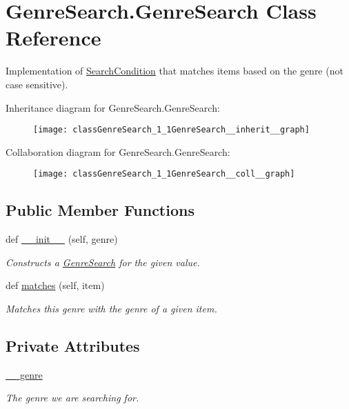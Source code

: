 \hypertarget{classGenreSearch_1_1GenreSearch}{}\section{Genre\+Search.\+Genre\+Search Class Reference}
\label{classGenreSearch_1_1GenreSearch}


Implementation of \hyperlink{namespaceSearchCondition}{Search\+Condition} that matches items based on the genre (not case sensitive).  




Inheritance diagram for Genre\+Search.\+Genre\+Search\+:\nopagebreak
\begin{figure}[H]
\begin{center}
\leavevmode
\texttt{[image: classGenreSearch\_1\_1GenreSearch\_\_inherit\_\_graph]}
\end{center}
\end{figure}


Collaboration diagram for Genre\+Search.\+Genre\+Search\+:\nopagebreak
\begin{figure}[H]
\begin{center}
\leavevmode
\texttt{[image: classGenreSearch\_1\_1GenreSearch\_\_coll\_\_graph]}
\end{center}
\end{figure}
\subsection*{Public Member Functions}
\begin{DoxyCompactItemize}
\item 
def \hyperlink{classGenreSearch_1_1GenreSearch_ad098e5ccc44530bafd752eca9b928ea7}{\+\_\+\+\_\+init\+\_\+\+\_\+} (self, genre)
\begin{DoxyCompactList}\small\item\em Constructs a \hyperlink{classGenreSearch_1_1GenreSearch}{Genre\+Search} for the given value. \end{DoxyCompactList}\item 
def \hyperlink{classGenreSearch_1_1GenreSearch_a5804ebb42a3d38e89a4591be173a22d0}{matches} (self, item)
\begin{DoxyCompactList}\small\item\em Matches this genre with the genre of a given item. \end{DoxyCompactList}\end{DoxyCompactItemize}
\subsection*{Private Attributes}
\begin{DoxyCompactItemize}
\item 
\hyperlink{classGenreSearch_1_1GenreSearch_a659affb5b3425cb942692d18a3d47b36}{\+\_\+\+\_\+genre}
\begin{DoxyCompactList}\small\item\em The genre we are searching for. \end{DoxyCompactList}\end{DoxyCompactItemize}



